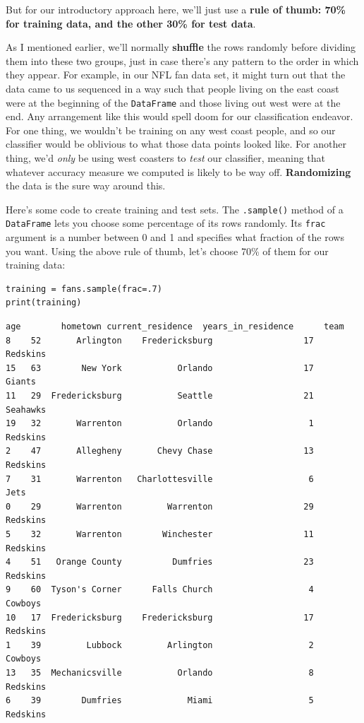 But for our introductory approach here, we'll just use a \textbf{rule of thumb:
70\% for training data, and the other 30\% for test data}.

As I mentioned earlier, we'll normally \textbf{shuffle} the rows randomly
before dividing them into these two groups, just in case there's any pattern to
the order in which they appear. For example, in our NFL fan data set, it might
turn out that the data came to us sequenced in a way such that people living on
the east coast were at the beginning of the \texttt{DataFrame} and those living
out west were at the end. Any arrangement like this would spell doom for our
classification endeavor. For one thing, we wouldn't be training on any west
coast people, and so our classifier would be oblivious to what those data
points looked like. For another thing, we'd \textit{only} be using west
coasters to \textit{test} our classifier, meaning that whatever accuracy
measure we computed is likely to be way off. \textbf{Randomizing} the data is
the sure way around this.

\label{sampleRows}

Here's some code to create training and test sets. The \texttt{.sample()}
method of a \texttt{DataFrame} lets you choose some percentage of its rows 
randomly. Its \texttt{frac} argument is a number between 0 and 1 and specifies
what fraction of the rows you want. Using the above rule of thumb, let's choose
70\% of them for our training data:

\begin{Verbatim}[fontsize=\small,samepage=true,frame=single,framesep=3mm]
training = fans.sample(frac=.7)
print(training)
\end{Verbatim}
\vspace{-.2in}

\begin{Verbatim}[fontsize=\small,samepage=true,frame=leftline,framesep=5mm,framerule=1mm]
    age        hometown current_residence  years_in_residence      team
8    52       Arlington    Fredericksburg                  17  Redskins
15   63        New York           Orlando                  17    Giants
11   29  Fredericksburg           Seattle                  21  Seahawks
19   32       Warrenton           Orlando                   1  Redskins
2    47       Allegheny       Chevy Chase                  13  Redskins
7    31       Warrenton   Charlottesville                   6      Jets
0    29       Warrenton         Warrenton                  29  Redskins
5    32       Warrenton        Winchester                  11  Redskins
4    51   Orange County          Dumfries                  23  Redskins
9    60  Tyson's Corner      Falls Church                   4   Cowboys
10   17  Fredericksburg    Fredericksburg                  17  Redskins
1    39         Lubbock         Arlington                   2   Cowboys
13   35  Mechanicsville           Orlando                   8  Redskins
6    39        Dumfries             Miami                   5  Redskins
\end{Verbatim}

